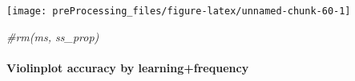 \documentclass[
]{article}
\newenvironment{Shaded}{\begin{snugshade}}{\end{snugshade}}
\newcommand{\CommentTok}[1]{\textcolor[rgb]{0.56,0.35,0.01}{\textit{#1}}}
\begin{document}
\begin{center}\texttt{[image: preProcessing\_files/figure-latex/unnamed-chunk-60-1]} \end{center}

\begin{Shaded}
\begin{Highlighting}[]
\CommentTok{#rm(ms, ss_prop)}
\end{Highlighting}
\end{Shaded}

\hypertarget{violinplot-accuracy-by-learningfrequency}{%
\paragraph{Violinplot accuracy by
learning+frequency}\label{violinplot-accuracy-by-learningfrequency}}
\end{document}
